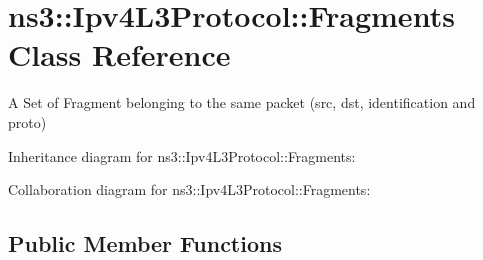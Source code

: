 \hypertarget{classns3_1_1Ipv4L3Protocol_1_1Fragments}{}\section{ns3\+:\+:Ipv4\+L3\+Protocol\+:\+:Fragments Class Reference}
\label{classns3_1_1Ipv4L3Protocol_1_1Fragments}


A Set of Fragment belonging to the same packet (src, dst, identification and proto)  




Inheritance diagram for ns3\+:\+:Ipv4\+L3\+Protocol\+:\+:Fragments\+:


Collaboration diagram for ns3\+:\+:Ipv4\+L3\+Protocol\+:\+:Fragments\+:
\subsection*{Public Member Functions}

